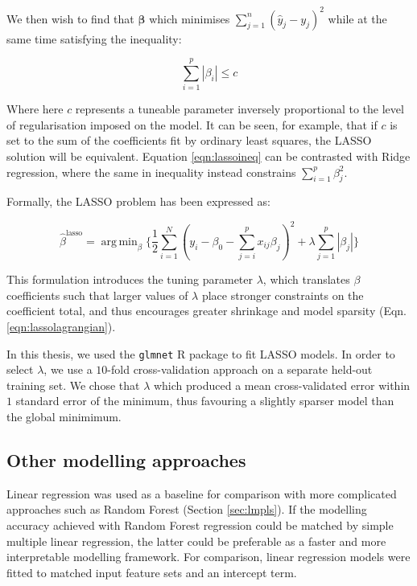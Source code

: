 \documentclass[a4paper,11pt,oneside]{book}
\DeclareMathOperator*{\argmin}{arg\,min}
\begin{document}
We then wish to find that $\bm{\beta}$ which minimises $\sum_{j=1}^{n}(\hat{y}_j - y_j)^2$ while at the same time satisfying the inequality:

\begin{equation}\label{eqn:lassoineq}
\sum\limits_{i=1}^{p} |\beta_i| \leq c
\end{equation} \vspace{.2em}

Where here $c$ represents a tuneable parameter inversely proportional to the level of regularisation imposed on the model. It can be seen, for example, that if $c$ is set to the sum of the coefficients fit by ordinary least squares, the LASSO solution will be equivalent. Equation \ref{eqn:lassoineq} can be contrasted with Ridge regression, where the same in inequality instead constrains $\sum_{i=1}^{p} \beta_j^2$.

Formally, the LASSO problem has been expressed as:\cite{Hastie2001}

\begin{equation}\label{eqn:lassolagrangian}
\hat{\beta}^\mathrm{lasso} = \argmin_\beta \bigg\{ 
\frac{1}{2} \sum_{i=1}^N (y_i - \beta_0 - \sum_{j=i}^p x_{ij}\beta_j)^2 
+ \lambda \sum_{j=1}^p |\beta_j|
\bigg\}
\end{equation} \vspace{.2em}

This formulation introduces the tuning parameter $\lambda$, which translates $\beta$ coefficients such that larger values of $\lambda$ place stronger constraints on the coefficient total, and thus encourages greater shrinkage and model sparsity (Eqn. \ref{eqn:lassolagrangian}).

In this thesis, we used the \texttt{glmnet} R package to fit LASSO models.\cite{glmnet1, glmnet2} In order to select $\lambda$, we use a $10$-fold cross-validation approach on a separate held-out training set. We chose that $\lambda$ which produced a mean cross-validated error within $1$ standard error of the minimum, thus favouring a slightly sparser model than the global minimimum.

\subsection{Other modelling approaches}\label{meth:othermodels}
 
Linear regression was used as a baseline for comparison with more complicated approaches such as Random Forest (Section \ref{sec:lmpls}). If the  modelling accuracy achieved with Random Forest regression could be matched by simple multiple linear regression, the latter could be preferable as a faster and more interpretable modelling framework. For comparison, linear regression models were fitted to matched input feature sets and an intercept term.
\end{document}
